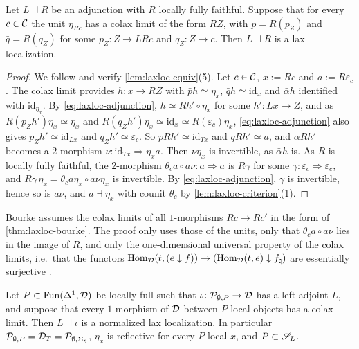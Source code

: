 \begin{thm}
\label{thm:laxloc-bourke}
%
Let $L \dashv R$ be an adjunction with $R$ locally fully faithful. Suppose that
for every $c \in \mathcal{C}$ the unit $\eta_{Rc}$ has a colax limit of the form $RZ$,
with
$\bar{p} = R(p_{Z})$
and
$\bar{q} = R(q_{Z})$
for some
$p_{Z}\colon Z \to LRc$
and
$q_{Z}\colon Z \to c$.
Then $L \dashv R$ is a lax localization.
\end{thm}

\begin{proof}
%
We follow \cite[Thm.~3.1]{bourke2025recognition} and verify
\cref{lem:laxloc-equiv}(5). Let $c \in \mathcal{C}$, $x := Rc$ and
$a := R\varepsilon_{c}$.
The colax limit provides
$h\colon x \to RZ$
with
$\bar{p}h \simeq \eta_{x}$,
$\bar{q}h \simeq \mathrm{id}_{x}$
and $\bar{\alpha}h$ identified with
$\mathrm{id}_{\eta_{x}}$.
By \eqref{eq:laxloc-adjunction},
$h \simeq Rh' \circ \eta_{x}$
for some
$h'\colon Lx \to Z$,
and as
$R(p_{Z}h')\eta_{x} \simeq \eta_{x}$
and
$R(q_{Z}h')\eta_{x} \simeq \mathrm{id}_{x} \simeq R(\varepsilon_{c})\eta_{x}$,
\eqref{eq:laxloc-adjunction} also gives
$p_{Z}h' \simeq \mathrm{id}_{Lx}$
and
$q_{Z}h' \simeq \varepsilon_{c}$.
So
$\bar{p}Rh' \simeq \mathrm{id}_{Tx}$
and
$\bar{q}Rh' \simeq a$,
and $\bar{\alpha}Rh'$ becomes a $2$-morphism
$\nu\colon \mathrm{id}_{Tx} \Rightarrow \eta_{x}a$.
Then $\nu\eta_{x}$ is invertible, as $\bar{\alpha}h$ is. As $R$ is locally fully
faithful, the $2$-morphism
$\theta_{c}a \circ a\nu\colon a \Rightarrow a$
is $R\gamma$ for some
$\gamma\colon \varepsilon_{c} \Rightarrow \varepsilon_{c}$,
and
$R\gamma\,\eta_{x} = \theta_{c}a\eta_{x} \circ a\nu\eta_{x}$
is invertible. By \eqref{eq:laxloc-adjunction}, $\gamma$ is invertible, hence
so is $a\nu$, and
$a \dashv \eta_{x}$
with counit $\theta_{c}$ by \cref{lem:laxloc-criterion}(1).
\end{proof}

\begin{rmk}
\label{rmk:laxloc-bourke}
%
Bourke assumes the colax limits of all $1$-morphisms
$Rc \to Rc'$
in the form of \cref{thm:laxloc-bourke}. The proof only uses those of the
units, only that
$\theta_{c}a \circ a\nu$
lies in the image of $R$, and only the
one-dimensional universal property of the colax limits, i.e.\ that the functors
$\operatorname{Hom}_{\mathcal{D}}(t,(e \downarrow f)) \to (\operatorname{Hom}_{\mathcal{D}}(t,e) \downarrow f_{\natural})$
are essentially surjective \cite[Rem.~3.2]{bourke2025recognition}.
\end{rmk}

\begin{cor}
\label{cor:laxloc-P}
%
Let
$P \subset \operatorname{Fun}(\Delta^{1},\mathcal{D})$
be locally full such that
$\iota\colon \mathcal{P}_{\emptyset,P} \to \mathcal{D}$
has a left adjoint $L$, and suppose that every $1$-morphism of $\mathcal{D}$ between
$P$-local objects has a colax limit. Then
$L \dashv \iota$
is a normalized lax localization. In particular
$\mathcal{P}_{\emptyset,P} = \mathcal{D}_{T} = \mathcal{P}_{\emptyset,\Sigma_{\eta}}$,
$\eta_{x}$ is reflective for every $P$-local $x$, and
$P \subset \mathscr{S}_{L}$.
\end{cor}

